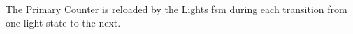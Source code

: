 The Primary Counter is reloaded by the Lights \ac{fsm} during each transition from one light state to the next.



